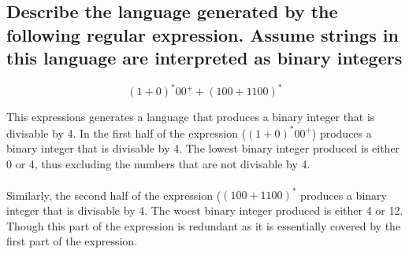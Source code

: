 \documentclass[12pt]{article}
\begin{document}
            \begin{figure}[ht]
                \centering
            \end{figure}

        \pagebreak
               
    \subsection{Describe the language generated by the following regular expression. Assume strings in this language are interpreted as binary integers}
            \[(1+0)^*00^++(100+1100)^*\]

            This expressions generates a language that produces a binary integer that is divisable by 4.
            In the first half of the expression (\((1+0)^*00^+\)) produces a binary integer
            that is divisable by 4. The lowest binary integer produced is either 0 or 4, thus excluding
            the numbers that are not divisable by 4.
            \\ \\
            Similarly, the second half of the expression (\((100+1100)^*\) produces a binary integer
            that is divisable by 4. The woest binary integer produced is either 4 or 12.
            Though this part of the expression is redundant as it is essentially covered
            by the first part of the expression.
\end{document}

